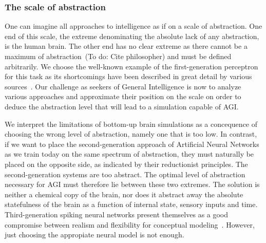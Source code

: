 \subsubsection{The scale of abstraction}
One can imagine all approaches to intelligence as if on a scale of abstraction.
One end of this scale, the extreme denominating the absolute lack of any abstraction, is the human brain.
The other end has no clear extreme as there cannot be a maximum of abstraction~(To do: Cite philosopher) and must 
be defined arbitrarily. We choose the well-known example of the first-generation perceptron for this task as its
shortcomings have been described in great detail by various sources~\cite{Anderson1995}.
Our challenge as seekers of General Intelligence is now to analyze various approaches and approximate their position on
the scale on order to deduce the abstraction level that will lead to a simulation capable of AGI\@.

We interpret the limitations of bottom-up brain simulations as a concequence of choosing the wrong level of abstraction, 
namely one that is too low. In contrast, if we want to place the second-generation approach of Artificial Neural Networks as we train today on
the same spectrum of abstraction, they must naturally be placed on the opposite side, as indicated by their reductionist
principles. The second-generation systems are too abstract. The optimal level of abstraction necessary for AGI must 
therefore lie between these two extremes. The solution is neither a chemical copy of the brain, nor does it abstract 
away the absolute statefulness of the brain as a function of internal state, sensory inputs and time.
Third-generation spiking neural networks present themselves as a good compromise between
realism and flexibility for conceptual modeling~\cite{Paugam-Moisy2012}. However, just choosing the appropiate
neural model is not enough. 

\bigskip


